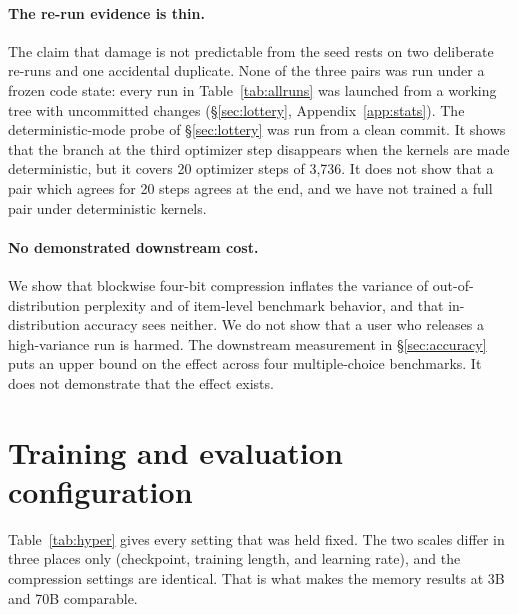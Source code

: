 \documentclass[11pt,letterpaper]{article}
\begin{document}
\paragraph{The re-run evidence is thin.} The claim that damage is not predictable from the seed rests on two deliberate re-runs and one accidental duplicate. None of the three pairs was run under a frozen code state: every run in Table~\ref{tab:allruns} was launched from a working tree with uncommitted changes (\S\ref{sec:lottery}, Appendix~\ref{app:stats}). The deterministic-mode probe of \S\ref{sec:lottery} was run from a clean commit. It shows that the branch at the third optimizer step disappears when the kernels are made deterministic, but it covers 20 optimizer steps of 3{,}736. It does not show that a pair which agrees for 20 steps agrees at the end, and we have not trained a full pair under deterministic kernels.

\paragraph{No demonstrated downstream cost.} We show that blockwise four-bit compression inflates the variance of out-of-distribution perplexity and of item-level benchmark behavior, and that in-distribution accuracy sees neither. We do not show that a user who releases a high-variance run is harmed. The downstream measurement in \S\ref{sec:accuracy} puts an upper bound on the effect across four multiple-choice benchmarks. It does not demonstrate that the effect exists.




\appendix

\section{Training and evaluation configuration}
\label{app:config}

Table~\ref{tab:hyper} gives every setting that was held fixed. The two scales differ in three places only (checkpoint, training length, and learning rate), and the compression settings are identical. That is what makes the memory results at 3B and 70B comparable.
\end{document}
